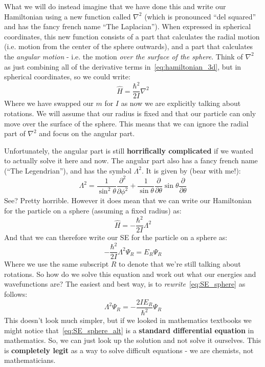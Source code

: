 \documentclass{memoir}[11pt,oneside,a4paper,openany]
\newcommand{\wf}{\ensuremath{\Psi}\xspace}
\begin{document}
What we will do instead imagine that we have done this and write our Hamiltonian using a new function called $\nabla^2$ (which is pronounced ``del squared'' and has the fancy french name ``The Laplacian''). When expressed in spherical coordinates, this new function consists of a part that calculates the radial motion (i.e. motion from the center of the sphere outwards), and a part that calculates the \emph{angular motion} - i.e. the motion \emph{over the surface of the sphere}. Think of $\nabla^2$ as just combining all of the derivative terms in~\autoref{eq:hamiltonian_3d}, but in spherical coordinates, so we could write:
\begin{equation}
	\hat{H} = \frac{\hbar^2}{2I}\nabla^2
\end{equation}
Where we have swapped our $m$ for $I$ as now we are explicitly talking about rotations. We will assume that our radius is fixed and that our particle can only move over the surface of the sphere. This means that we can ignore the radial part of $\nabla^2$ and focus on the angular part.  

Unfortunately, the angular part is still \textbf{horrifically complicated} if we wanted to actually solve it here and now. The angular part also has a fancy french name (``The Legendrian''), and has the symbol $\Lambda^2$. It is given by (bear with me!):
\begin{equation}
	\Lambda^2 = \frac{1}{\sin^2\theta}\frac{\partial^2}{\partial\phi^2} + \frac{1}{\sin\theta}\frac{\partial}{\partial \theta}\sin\theta\frac{\partial}{\partial\theta}
\end{equation}
See? Pretty horrible. However it does mean that we can write our Hamiltonian for the particle on a sphere (assuming a fixed radius) as:
\begin{equation}
	\hat{H} = -\frac{\hbar^2}{2I}\Lambda^2
\end{equation}
And that we can therefore write our SE for the particle on a sphere as:
\begin{equation}\label{eq:SE_sphere}
	-\frac{\hbar^2}{2I}\Lambda^2\wf_R = E_R\wf_R
\end{equation}
Where we use the same subscript $R$ to denote that we're still talking about rotations. So how do we solve this equation and work out what our energies and wavefunctions are? The easiest and best way, is to \emph{rewrite}~\autoref{eq:SE_sphere} as follows:
\begin{equation}\label{eq:SE_sphere_alt}
	\Lambda^2\wf_R = -\frac{2IE_R}{\hbar^2}\wf_R
\end{equation}
This doesn't look much simpler, but if we looked in mathematics textbooks we might notice that~\autoref{eq:SE_sphere_alt} is a \textbf{standard differential equation} in mathematics. So, we can just look up the solution and not solve it ourselves. This is \textbf{completely legit} as a way to solve difficult equations - we are chemists, not mathematicians.
\end{document}
